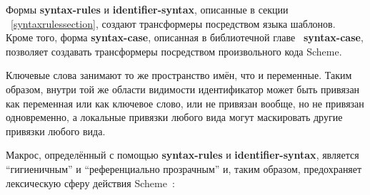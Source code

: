 Формы {\cf\bfseries syntax-rules} и {\cf\bfseries identifier-syntax}, описанные в секции
~\ref{syntaxrulessection}, создают трансформеры посредством языка шаблонов. Кроме того, форма
{\cf\bfseries syntax-case}, описанная в библиотечной главе~
{{\cf\bfseries syntax-case}}, позволяет создавать трансформеры посредством произвольного кода
Scheme.\vspace{1mm}

Ключевые слова занимают то же пространство имён, что и переменные. Таким образом, внутри той же
области видимости идентификатор может быть привязан как переменная или как ключевое слово, или
не привязан вообще, но не привязан одновременно, а локальные привязки любого вида могут
маскировать другие привязки любого вида.\vspace{1mm}

Макрос, определённый с помощью {\cf\bfseries syntax-rules} и {\cf\bfseries
  identifier-\hp{}syntax}, является ``гигиеничным'' и ``референциально прозрачным'' и, таким
образом, предохраняет лексическую сферу действия
Scheme~\cite{Kohlbecker86,hygienic,Bawden88,macrosthatwork,syntacticabstraction}:

